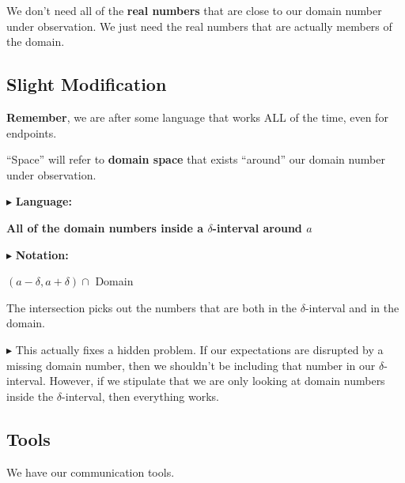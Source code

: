 \documentclass{ximera}
\begin{document}
We don't need all of the \textbf{\textcolor{purple!70!blue}{real numbers}} that are close to our domain number under observation. We just need the real numbers that are actually members of the domain.




\subsection*{Slight Modification}


\textbf{Remember}, we are after some language that works ALL of the time, even for endpoints.   



``Space'' will refer to \textbf{\textcolor{red!70!darkgray}{domain space}} that exists ``around'' our domain number under observation. 



$\blacktriangleright$ \textbf{\textcolor{purple!85!blue}{Language:}}   

\begin{center}
\textbf{All of the domain numbers inside a $\delta$-interval around $a$} 
\end{center}






$\blacktriangleright$ \textbf{\textcolor{purple!85!blue}{Notation:}}   

\begin{center}
$(a - \delta, a + \delta) \cap$ Domain
\end{center}



The intersection picks out the numbers that are both in the $\delta$-interval and in the domain. 





$\blacktriangleright$ This actually fixes a hidden problem.  If our expectations are disrupted by a missing domain number, then we shouldn't be including that number in our $\delta$-interval.  However, if we stipulate that we are only looking at domain numbers inside the $\delta$-interval, then everything works. 




\subsection*{Tools}


We have our communication tools.
\end{document}
